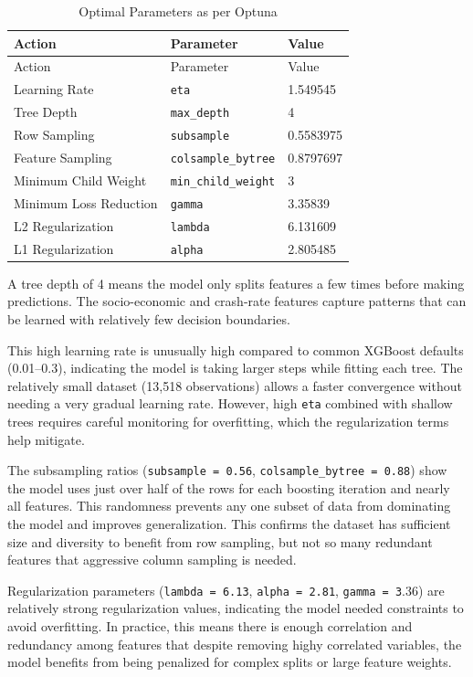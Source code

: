 \documentclass[
  number,
  review,
  3p]{elsarticle}
\begin{document}
\begin{longtable}[]{@{}lll@{}}
\caption{Optimal Parameters as per Optuna}\tabularnewline
\toprule\noalign{}
Action & Parameter & Value \\
\midrule\noalign{}
\endfirsthead
\toprule\noalign{}
Action & Parameter & Value \\
\midrule\noalign{}
\endhead
\bottomrule\noalign{}
\endlastfoot
Learning Rate & \texttt{eta} & 1.549545 \\
Tree Depth & \texttt{max\_depth} & 4 \\
Row Sampling & \texttt{subsample} & 0.5583975 \\
Feature Sampling & \texttt{colsample\_bytree} & 0.8797697 \\
Minimum Child Weight & \texttt{min\_child\_weight} & 3 \\
Minimum Loss Reduction & \texttt{gamma} & 3.35839 \\
L2 Regularization & \texttt{lambda} & 6.131609 \\
L1 Regularization & \texttt{alpha} & 2.805485 \\
\end{longtable}

A tree depth of 4 means the model only splits features a few times
before making predictions. The socio-economic and crash-rate features
capture patterns that can be learned with relatively few decision
boundaries.

This high learning rate is unusually high compared to common XGBoost
defaults (0.01--0.3), indicating the model is taking larger steps while
fitting each tree. The relatively small dataset (13,518 observations)
allows a faster convergence without needing a very gradual learning
rate. However, high \texttt{eta} combined with shallow trees requires
careful monitoring for overfitting, which the regularization terms help
mitigate.

The subsampling ratios (\texttt{subsample\ =\ 0.56},
\texttt{colsample\_bytree\ =\ 0.88}) show the model uses just over half
of the rows for each boosting iteration and nearly all features. This
randomness prevents any one subset of data from dominating the model and
improves generalization. This confirms the dataset has sufficient size
and diversity to benefit from row sampling, but not so many redundant
features that aggressive column sampling is needed.

Regularization parameters (\texttt{lambda\ =\ 6.13},
\texttt{alpha\ =\ 2.81}, \texttt{gamma\ =\ 3}.36) are relatively strong
regularization values, indicating the model needed constraints to avoid
overfitting. In practice, this means there is enough correlation and
redundancy among features that despite removing highy correlated
variables, the model benefits from being penalized for complex splits or
large feature weights.
\end{document}
